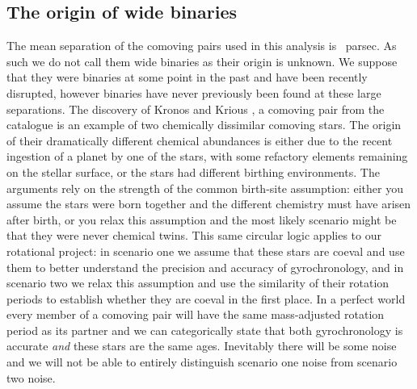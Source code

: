 \subsection{The origin of wide binaries}
The mean separation of the comoving pairs used in this analysis is \meansep\
parsec.
As such we do not call them wide binaries as their origin is unknown.
We suppose that they were binaries at some point in the past and have been
recently disrupted, however binaries have never previously been found at these
large separations.
The discovery of Kronos and Krious \citep{oh2017}, a comoving pair from
the \citep{oh2017} catalogue is an example of two chemically dissimilar
comoving stars.
The origin of their dramatically different chemical abundances is either due
to the recent ingestion of a planet by one of the stars, with some refactory
elements remaining on the stellar surface, or the stars had different birthing
environments.
The arguments rely on the strength of the common birth-site assumption: either
you assume the stars were born together and the different chemistry must
have arisen after birth, or you relax this assumption and the most likely
scenario might be that they were never chemical twins.
This same circular logic applies to our rotational project: in scenario one we
assume that these stars are coeval and use them to better understand the
precision and accuracy of gyrochronology, and in scenario two we relax this
assumption and use the similarity of their rotation periods to establish
whether they are coeval in the first place.
In a perfect world every member of a comoving pair will have the same
mass-adjusted rotation period as its partner and we can categorically state
that both gyrochronology is accurate {\it and} these stars are the same ages.
Inevitably there will be some noise and we will not be able to entirely
distinguish scenario one noise from scenario two noise.
